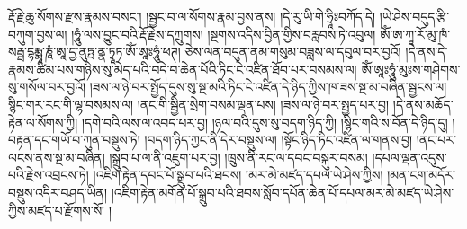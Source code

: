 རྡོ་རྗེ་ཆུ་སོགས་རྫས་རྣམས་བསང་། །སྦྱང་བ་ལ་སོགས་རྣམ་བྱས་ནས། །དེ་རུ་ཡི་གེ་ཧྲཱིཿབཀོད་དེ། །ཡེ་ཤེས་བདུད་རྩི་བཀུག་བྱས་ལ། །ཧཱུཾ་ལས་བྱུང་བའི་རྡོ་རྗེས་དཀྲུགས། །སྔགས་འདིས་བྱིན་གྱིས་བརླབས་ཏེ་འབུལ། ཨོཾ་ཨ་ཀཱ་རོ་མུ་ཁཾ་སརྦྦ་དྷརྨྨཱ་ཎཱཾ་ཨཱ་དྱ་ནུཏྤ་ནྣ་ཏྭཱཏ་ཨོཾ་ཨཱཿཧཱུཾ་ཕཊ། ཅེས་ལན་བདུན་ནམ་གསུམ་བཟླས་ལ་དབུལ་བར་བྱའོ། །དེ་ནས་དེ་རྣམས་ཚིམ་པས་གཉིས་སུ་མེད་པའི་བདེ་བ་ཆེན་པོའི་ཏིང་ངེ་འཛིན་ཐོབ་པར་བསམས་ལ། ཨོཾ་ཨཱཿཧཱུཾ་མུཿས་གཤེགས་སུ་གསོལ་བར་བྱའོ། །ཟས་ལ་ཉེ་བར་སྤྱོད་དུས་སུ་སྔ་མའི་ཏིང་ངེ་འཛིན་དེ་ཉིད་ཀྱིས་ཁ་ཟས་སྔ་མ་བཞིན་སྦྱངས་ལ། སྙིང་གར་རང་གི་ལྷ་བསམས་ལ། །ནང་གི་སྦྱིན་སྲེག་བསམ་ལྡན་པས། །ཟས་ལ་ཉེ་བར་སྤྱད་པར་བྱ། །དེ་ནས་མཆོད་རྟེན་ལ་སོགས་ཀྱི། །དགེ་བའི་ལས་ལ་འབད་པར་བྱ། །ཉལ་བའི་དུས་སུ་བདག་ཉིད་ཀྱི། །སྙིང་གའི་ས་བོན་དེ་ཉིད་དུ། །བརྟན་དང་གཡོ་བ་ཀུན་བསྡུས་ཏེ། །བདག་ཉིད་ཀྱང་ནི་དེར་བསྡུས་ལ། །སྟོང་ཉིད་ཏིང་འཛིན་ལ་གནས་བྱ། །ནང་པར་ལངས་ནས་སྔ་མ་བཞིན། །སྒྲུབ་པ་ལ་ནི་འཇུག་པར་བྱ། །ཁྲུས་ནི་རང་ལ་དབང་བསྐུར་བསམ། །དཔལ་ལྡན་འདུས་པའི་རྗེས་འབྲངས་ཏེ། །འཇིག་རྟེན་དབང་པོ་སྒྲུབ་པའི་ཐབས། །མར་མེ་མཛད་དཔལ་ཡེ་ཤེས་ཀྱིས། །མན་ངག་མདོར་བསྡུས་འདིར་བཤད་ཡིན། །འཇིག་རྟེན་མགོན་པོ་སྒྲུབ་པའི་ཐབས་སློབ་དཔོན་ཆེན་པོ་དཔལ་མར་མེ་མཛད་ཡེ་ཤེས་ཀྱིས་མཛད་པ་རྫོགས་སོ། །